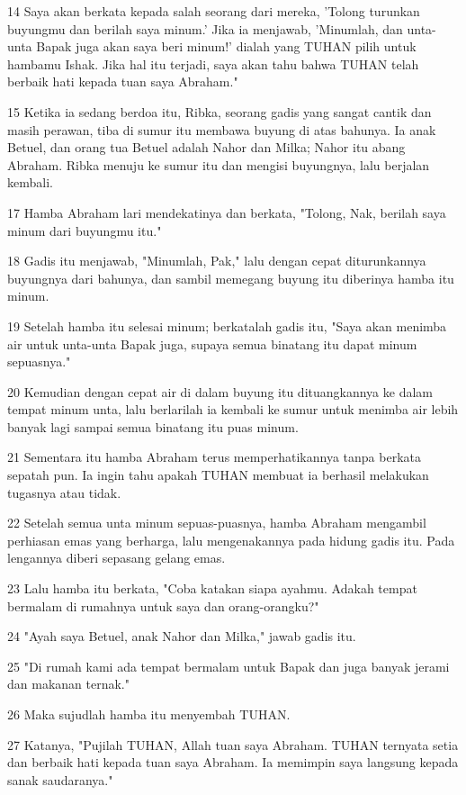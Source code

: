 \par 14 Saya akan berkata kepada salah seorang dari mereka, 'Tolong turunkan buyungmu dan berilah saya minum.' Jika ia menjawab, 'Minumlah, dan unta-unta Bapak juga akan saya beri minum!' dialah yang TUHAN pilih untuk hambamu Ishak. Jika hal itu terjadi, saya akan tahu bahwa TUHAN telah berbaik hati kepada tuan saya Abraham."
\par 15 Ketika ia sedang berdoa itu, Ribka, seorang gadis yang sangat cantik dan masih perawan, tiba di sumur itu membawa buyung di atas bahunya. Ia anak Betuel, dan orang tua Betuel adalah Nahor dan Milka; Nahor itu abang Abraham. Ribka menuju ke sumur itu dan mengisi buyungnya, lalu berjalan kembali.
\par 17 Hamba Abraham lari mendekatinya dan berkata, "Tolong, Nak, berilah saya minum dari buyungmu itu."
\par 18 Gadis itu menjawab, "Minumlah, Pak," lalu dengan cepat diturunkannya buyungnya dari bahunya, dan sambil memegang buyung itu diberinya hamba itu minum.
\par 19 Setelah hamba itu selesai minum; berkatalah gadis itu, "Saya akan menimba air untuk unta-unta Bapak juga, supaya semua binatang itu dapat minum sepuasnya."
\par 20 Kemudian dengan cepat air di dalam buyung itu dituangkannya ke dalam tempat minum unta, lalu berlarilah ia kembali ke sumur untuk menimba air lebih banyak lagi sampai semua binatang itu puas minum.
\par 21 Sementara itu hamba Abraham terus memperhatikannya tanpa berkata sepatah pun. Ia ingin tahu apakah TUHAN membuat ia berhasil melakukan tugasnya atau tidak.
\par 22 Setelah semua unta minum sepuas-puasnya, hamba Abraham mengambil perhiasan emas yang berharga, lalu mengenakannya pada hidung gadis itu. Pada lengannya diberi sepasang gelang emas.
\par 23 Lalu hamba itu berkata, "Coba katakan siapa ayahmu. Adakah tempat bermalam di rumahnya untuk saya dan orang-orangku?"
\par 24 "Ayah saya Betuel, anak Nahor dan Milka," jawab gadis itu.
\par 25 "Di rumah kami ada tempat bermalam untuk Bapak dan juga banyak jerami dan makanan ternak."
\par 26 Maka sujudlah hamba itu menyembah TUHAN.
\par 27 Katanya, "Pujilah TUHAN, Allah tuan saya Abraham. TUHAN ternyata setia dan berbaik hati kepada tuan saya Abraham. Ia memimpin saya langsung kepada sanak saudaranya."
